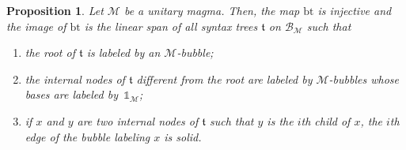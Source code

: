 \documentclass[10pt,reqno]{amsart}
\numberwithin{equation}{subsection}
\newtheorem{Proposition}[Theorem]{Proposition}
\newcommand{\Mca}{\mathcal{M}}
\newcommand{\Tfr}{\mathfrak{t}}
\newcommand{\Unit}{\mathds{1}}
\newcommand{\Bubbles}{\mathcal{B}}
\newcommand{\BubbleTree}{\mathrm{bt}}
\begin{document}
\begin{Proposition} \label{prop:map_NC_M_bubble_tree}
    Let $\Mca$ be a unitary magma. Then, the map $\BubbleTree$ is
    injective and the image of $\BubbleTree$ is the linear span of all
    syntax trees $\Tfr$ on $\Bubbles_\Mca$ such that
    \begin{enumerate}[fullwidth,label={(\it\roman*)}]
        \item \label{item:map_NC_M_bubble_tree_1}
        the root of $\Tfr$ is labeled by an $\Mca$-bubble;
        \item \label{item:map_NC_M_bubble_tree_2}
        the internal nodes of $\Tfr$ different from the root are
        labeled by $\Mca$-bubbles whose bases are labeled
        by~$\Unit_\Mca$;
        \item \label{item:map_NC_M_bubble_tree_3}
        if $x$ and $y$ are two internal nodes of $\Tfr$ such that $y$ is
        the $i$th child of $x$, the $i$th edge of the bubble labeling
        $x$ is solid.
    \end{enumerate}
\end{Proposition}
\end{document}
